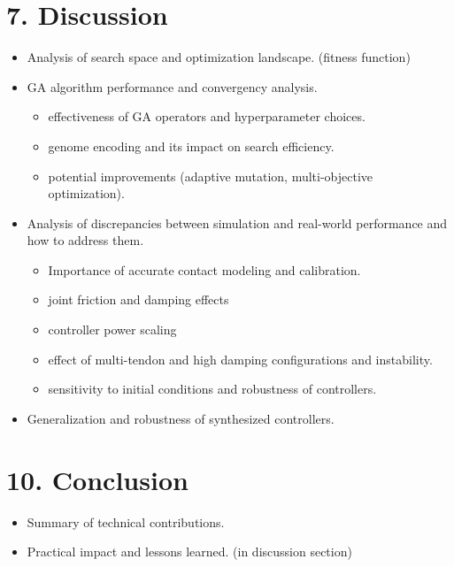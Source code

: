 \documentclass[12pt,a4paper]{article}
\begin{document}
\section*{7. Discussion}
\begin{itemize}
  \item Analysis of search space and optimization landscape. (fitness function)
  \item GA algorithm performance and convergency analysis.
  \begin{itemize}
    \item effectiveness of GA operators and hyperparameter choices.
    \item genome encoding and its impact on search efficiency.
    \item potential improvements (adaptive mutation, multi-objective optimization).
  \end{itemize}
  \item Analysis of discrepancies between simulation and real-world performance and how to address them.
  \begin{itemize}
    \item Importance of accurate contact modeling and calibration.
    \item joint friction and damping effects
    \item controller power scaling
    \item effect of multi-tendon and high damping configurations and instability.
    \item sensitivity to initial conditions and robustness of controllers.
  \end{itemize}
  \item Generalization and robustness of synthesized controllers.
\end{itemize}

\section*{10. Conclusion}
\begin{itemize}
  \item Summary of technical contributions.
  \item Practical impact and lessons learned. (in discussion section)
\end{itemize}

\end{document}

